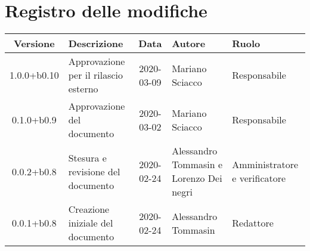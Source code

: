 \section*{Registro delle modifiche}

\begin{center}
	\begin{longtable}{|c|p{3.5cm}|c|p{3cm}|p{3cm}|}
	\hline
	\rowcolor{lighter-grayer}
	\textbf{Versione} & \textbf{Descrizione} & \textbf{Data} & \textbf{Autore} & \textbf{Ruolo} \\
	\hline
	\endfirsthead

	1.0.0+b0.10 & Approvazione per il rilascio esterno & 2020-03-09 & Mariano Sciacco & Responsabile \\
	\hline
	0.1.0+b0.9 & Approvazione del documento & 2020-03-02 & Mariano Sciacco & Responsabile \\
	\hline
	0.0.2+b0.8 & Stesura e revisione del documento & 2020-02-24 & Alessandro Tommasin e Lorenzo Dei negri & Amministratore e verificatore \\
	\hline
	0.0.1+b0.8 & Creazione iniziale del documento & 2020-02-24 & Alessandro Tommasin & Redattore \\
	\hline

	\end{longtable}
\end{center}